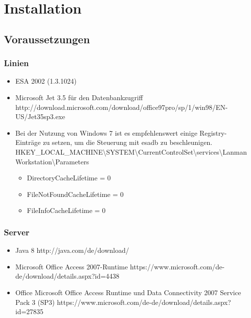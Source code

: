 \chapter{Installation}

\section{Voraussetzungen}

\subsection{Linien}
\begin{itemize}
  \item ESA 2002 (1.3.1024)
  \item Microsoft Jet 3.5 für den Datenbankzugriff \newline http://download.microsoft.com/download/office97pro/sp/1/win98/EN-US/Jet35sp3.exe
  \item Bei der Nutzung von Windows 7 ist es empfehlenswert einige Registry-Einträge zu setzen, um die Steuerung mit esadb zu beschleunigen. \newline \newline
        HKEY\_LOCAL\_MACHINE\textbackslash SYSTEM\textbackslash CurrentControlSet\textbackslash services\textbackslash LanmanWorkstation\textbackslash Parameters
        \begin{itemize}
         \item DirectoryCacheLifetime = 0
         \item FileNotFoundCacheLifetime = 0
         \item FileInfoCacheLifetime = 0
        \end{itemize}
\end{itemize}
        
\subsection{Server}
\begin{itemize}
  \item Java 8 \newline http://java.com/de/download/
  \item Microsoft Office Access 2007-Runtime \newline https://www.microsoft.com/de-de/download/details.aspx?id=4438
  \item Office Microsoft Office Access Runtime und Data Connectivity 2007 Service Pack 3 (SP3) \newline https://www.microsoft.com/de-de/download/details.aspx?id=27835
\end{itemize}

